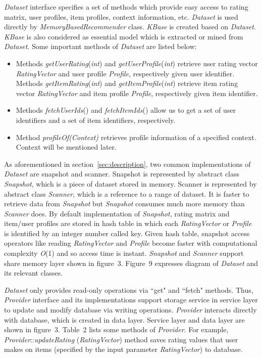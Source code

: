 \documentclass[a4paper]{llncs}
\begin{document}
\textit{Dataset} interface specifies a set of methods which provide easy access to rating matrix, user profiles, item profiles, context information, etc. \textit{Dataset} is used directly by \textit{MemoryBasedRecommender} class. \textit{KBase} is created based on \textit{Dataset}. \textit{KBase} is also considered as essential model which is extracted or mined from \textit{Dataset}. Some important methods of \textit{Dataset} are listed below:
\begin{itemize}
\item Methods \textit{getUserRating}(\textit{int}) and \textit{getUserProfile}(\textit{int}) retrieve user rating vector \textit{RatingVector} and user profile \textit{Profile}, respectively given user identifier. Methods \textit{getItemRating}(\textit{int}) and \textit{getItemProfile}(\textit{int}) retrieve item rating vector \textit{RatingVector} and item profile \textit{Profile}, respectively given item identifier.
\item Methods \textit{fetchUserIds}() and \textit{fetchItemIds}() allow us to get a set of user identifiers and a set of item identifiers, respectively.
\item Method \textit{profileOf(Context)} retrieves profile information of a specified context. Context will be mentioned later.
\end{itemize}
As aforementioned in section~\ref{sec:description}, two common implementations of \textit{Dataset} are snapshot and scanner. Snapshot is represented by abstract class \textit{Snapshot}, which is a piece of dataset stored in memory. Scanner is represented by abstract class \textit{Scanner}, which is a reference to a range of dataset. It is faster to retrieve data from \textit{Snapshot} but \textit{Snapshot} consumes much more memory than \textit{Scanner} does. By default implementation of \textit{Snapshot}, rating matrix and item/user profiles are stored in hash table in which each \textit{RatingVector} or \textit{Profile} is identified by an integer number called key. Given hash table, snapshot access operators like reading \textit{RatingVector} and \textit{Profile} become faster with computational complexity \textit{O}(1) and so access time is instant. \textit{Snapshot} and \textit{Scanner} support share memory layer shown in figure~3. Figure~9 expresses diagram of \textit{Dataset} and its relevant classes.

\textit{Dataset} only provides read-only operations via ``get" and ``fetch" methods. Thus, \textit{Provider} interface and its implementations support storage service in service layer to update and modify database via writing operations. \textit{Provider} interacts directly with database, which is created in data layer. Service layer and data layer are shown in figure~3. Table~2 lists some methods of \textit{Provider}. For example, \textit{Provider}::\textit{updateRating} (\textit{RatingVector}) method saves rating values that user makes on items (specified by the input parameter \textit{RatingVector}) to database.
\end{document}
